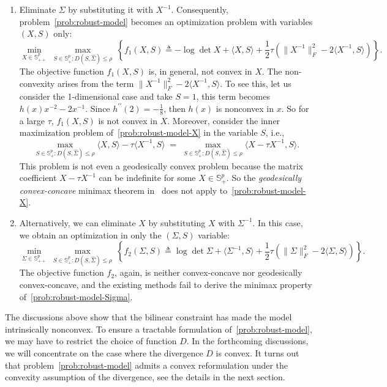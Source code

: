 \documentclass[11pt]{article}
\def\S{\mathbb{S}}
\def\la{\langle}
\def\PSD{{\S^k_{++}}}
\def\ra{\rangle}
\def\S{\mathbb{S}}
\def\la{\langle}
\def\PSD{{\S^p_{+}}}
\def\PD{{\S^p_{++}}}
\def\ra{\rangle}
\begin{document}
\begin{enumerate}[leftmargin=5mm, label = (\roman*)]
    \item Eliminate $\Sigma$ by substituting it with $X^{-1}$. Consequently, problem~\eqref{prob:robust-model} becomes an optimization problem with variables $(X, S)$ only:
    \begin{equation}\label{prob:robust-model-X}
        \displaystyle \min_{X \in \PD} ~\max\limits_{S \in \PSD: D(S, \widehat{\Sigma})\leq  \rho}~\left\{ f_1(X, S) \triangleq -\log\det X+\la X,S\ra +\frac{1}{2}\tau \left(\|X^{-1}\|_F^2 - 2\la X^{-1}, S\ra\right) \right\}.
    \end{equation}
    The objective function $f_1(X, S)$ is, in general, not convex in  $X$. 
    The non-convexity arises from the term $\|X^{-1}\|_F^2 - 2\la X^{-1}, S\ra$. To see this, let us consider the 1-dimensional case and take $S=1$, this term becomes $h(x)  x^{-2}-2x^{-1}$. Since
    $h^{\prime\prime}(2)=-\frac{1}{8}$, then $h(x)$ is nonconvex in $x$. So for a large $\tau$, $f_1(X, S)$ is not convex in $X$. 
        Moreover, consider the inner maximization problem of~\eqref{prob:robust-model-X} in the variable $S$, i.e.,
    \[
        \max\limits_{S \in \PSD: D(S, \widehat{\Sigma})\leq  \rho} \la X, S\ra - \tau\la X^{-1}, S\ra \;=\; \max\limits_{S \in \PSD: D(S, \widehat{\Sigma})\leq  \rho} \la X-\tau X^{-1}, S\ra.
    \]
    This problem is not even a geodesically convex problem because the matrix coefficient $X-\tau X^{-1}$ can be indefinite for some $X\in \PSD$. So the {\it geodesically convex-concave} minimax theorem in~\cite[theorem 3]{ref:yue2024geometric} does not apply to~\eqref{prob:robust-model-X}.

    \item Alternatively, we can eliminate $X$ by substituting $X$ with $\Sigma^{-1}$. In this case, we obtain an optimization in only the $(\Sigma, S)$ variable:
    \begin{equation}\label{prob:robust-model-Sigma}
        \displaystyle \min_{\Sigma \in \PD} ~\max\limits_{S \in \PSD: D(S, \widehat{\Sigma})\leq  \rho}~\left\{ f_2(\Sigma, S) \triangleq \log\det \Sigma +\la \Sigma^{-1},S\ra +\frac{1}{2}\tau \left(\|\Sigma \|_F^2 - 2\la \Sigma, S\ra\right) \right\}.
    \end{equation}
    The objective function $f_2$, again, is neither convex-concave nor geodesically convex-concave, and the existing methods fail to derive the minimax property of~\eqref{prob:robust-model-Sigma}.
\end{enumerate} 
The discussions above show that the bilinear constraint has made the model intrinsically nonconvex. To ensure a tractable formulation of~\eqref{prob:robust-model}, we may 
have to restrict the choice of function $D$.
In the forthcoming discussions, we will concentrate on the case where the divergence $D$ is convex. It turns out that problem~\eqref{prob:robust-model} admits a convex reformulation under the convexity assumption of the divergence, see the details in the next section.
\end{document}
